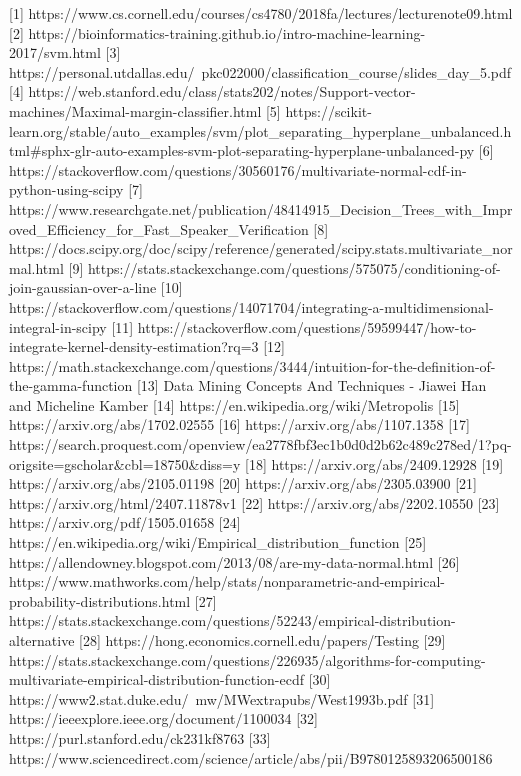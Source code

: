 [1] https://www.cs.cornell.edu/courses/cs4780/2018fa/lectures/lecturenote09.html
[2] https://bioinformatics-training.github.io/intro-machine-learning-2017/svm.html
[3] https://personal.utdallas.edu/~pkc022000/classification_course/slides_day_5.pdf
[4] https://web.stanford.edu/class/stats202/notes/Support-vector-machines/Maximal-margin-classifier.html
[5] https://scikit-learn.org/stable/auto_examples/svm/plot_separating_hyperplane_unbalanced.html#sphx-glr-auto-examples-svm-plot-separating-hyperplane-unbalanced-py
[6] https://stackoverflow.com/questions/30560176/multivariate-normal-cdf-in-python-using-scipy
[7] https://www.researchgate.net/publication/48414915_Decision_Trees_with_Improved_Efficiency_for_Fast_Speaker_Verification
[8] https://docs.scipy.org/doc/scipy/reference/generated/scipy.stats.multivariate_normal.html
[9] https://stats.stackexchange.com/questions/575075/conditioning-of-join-gaussian-over-a-line
[10] https://stackoverflow.com/questions/14071704/integrating-a-multidimensional-integral-in-scipy
[11] https://stackoverflow.com/questions/59599447/how-to-integrate-kernel-density-estimation?rq=3
[12] https://math.stackexchange.com/questions/3444/intuition-for-the-definition-of-the-gamma-function
[13] Data Mining Concepts And Techniques - Jiawei Han and Micheline Kamber
[14] https://en.wikipedia.org/wiki/Metropolis%
[15] https://arxiv.org/abs/1702.02555
[16] https://arxiv.org/abs/1107.1358
[17] https://search.proquest.com/openview/ea2778fbf3ec1b0d0d2b62c489c278ed/1?pq-origsite=gscholar&cbl=18750&diss=y
[18] https://arxiv.org/abs/2409.12928
[19] https://arxiv.org/abs/2105.01198
[20] https://arxiv.org/abs/2305.03900
[21] https://arxiv.org/html/2407.11878v1
[22] https://arxiv.org/abs/2202.10550
[23] https://arxiv.org/pdf/1505.01658
[24] https://en.wikipedia.org/wiki/Empirical_distribution_function
[25] https://allendowney.blogspot.com/2013/08/are-my-data-normal.html
[26] https://www.mathworks.com/help/stats/nonparametric-and-empirical-probability-distributions.html
[27] https://stats.stackexchange.com/questions/52243/empirical-distribution-alternative
[28] https://hong.economics.cornell.edu/papers/Testing%
[29] https://stats.stackexchange.com/questions/226935/algorithms-for-computing-multivariate-empirical-distribution-function-ecdf
[30] https://www2.stat.duke.edu/~mw/MWextrapubs/West1993b.pdf
[31] https://ieeexplore.ieee.org/document/1100034
[32] https://purl.stanford.edu/ck231kf8763
[33] https://www.sciencedirect.com/science/article/abs/pii/B9780125893206500186
